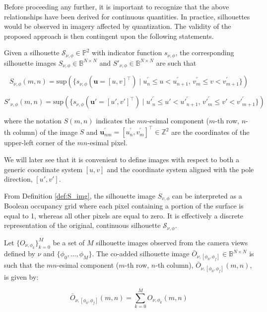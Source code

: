 Before proceeding any further, it is important to recognize that the above relationships have been derived for continuous quantities. In practice, silhouettes would be observed in imagery affected by quantization. The validity of the proposed approach is then contingent upon the following statements.

\begin{definition}
    \label{def:S_img}
    Given a silhouette $\mathcal{S}_{\nu,\phi}\in\mathbb{P}^2$ with indicator function $s_{\nu,\phi}$, the corresponding silhouette images $S_{\nu,\phi} \in \mathbb{B}^{N\times N}$ and $S'_{\nu,\phi} \in \mathbb{B}^{N\times N}$ are such that
    
    \begin{equation}
        S_{\nu,\phi}(m,n) = \mathrm{sup}\left( \{ s_{\nu,\phi}(\mathbf{u}=[u,v]^\top) \; | \; u^\ulcorner_n \leq u < u^\ulcorner_{n+1},\, v^\ulcorner_m \leq v < v^\ulcorner_{m+1}\} \right)
    \end{equation}

    \begin{equation}
    \label{eq:S'}
        S'_{\nu,\phi}(m,n) = \mathrm{sup}\left( \{ s_{\nu,\phi}(\mathbf{u}'=[u',v']^\top) \; | \; u'^\ulcorner_n \leq u' < u'^\ulcorner_{n+1},\, v'^\ulcorner_m \leq v' < v'^\ulcorner_{m+1} \} \right)
    \end{equation}

    where the notation $S(m,n)$ indicates the $mn$-esimal component ($m$-th row, $n$-th column) of the image $S$ and $\mathbf{u}^\ulcorner_{nm}=[u^\ulcorner_n,v^\ulcorner_m]^\top \in \mathbb{Z}^2$ are the coordinates of the upper-left corner of the $mn$-esimal pixel.
    
\end{definition}

We will later see that it is convenient to define images with respect to both a generic coordinate system $[u,v]$ and the coordinate system aligned with the pole direction, $[u',v']$.

From Definition \ref{def:S_img}, the silhouette image $S_{v,\phi}$ can be interpreted as a Boolean occupancy grid where each pixel containing a portion of the surface is equal to 1, whereas all other pixels are equal to zero. It is effectively a discrete representation of the original, continuous silhouette $\mathcal{S}_{\nu,\phi}$.

\begin{definition}
     \label{def:O_bar}
     Let $\{ O_{\nu,\phi_k} \}_{k = 0}^M$  be a set of $M$ silhouette images observed from the camera views defined by $\nu$ and $\{ \phi_0, \dots, \phi_M \}$. The co-added silhouette image $\bar{O}_{\nu,[\phi_0,\phi_f]}\in \mathbb{B}^{N\times N}$ is such that the $mn$-esimal component  ($m$-th row, $n$-th column), $\bar{O}_{\nu,[\phi_0,\phi_f]}(m,n)$, is given by:

     \begin{equation}
         \bar{O}_{\nu,[\phi_0,\phi_f]}(m,n) = \sum_{k=0}^M O_{\nu,\phi_k}(m,n)
     \end{equation}
     
\end{definition}

